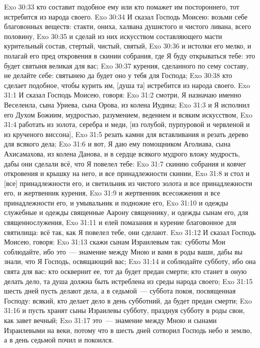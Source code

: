 \vs Exo 30:33 кто составит подобное ему или кто помажет им постороннего, тот истребится из народа своего.
\rsbpar\vs Exo 30:34 И сказал Господь Моисею: возьми себе благовонных веществ: стакти, ониха, халвана душистого и чистого ливана, всего половину,
\vs Exo 30:35 и сделай из них искусством составляющего масти курительный состав, стертый, чистый, святый,
\vs Exo 30:36 и истолки его мелко, и полагай его пред  откровения в скинии собрания, где Я буду открываться тебе: это будет святыня великая для вас;
\vs Exo 30:37 курения, сделанного по сему составу, не делайте себе: святынею да будет оно у тебя для Господа;
\vs Exo 30:38 кто сделает подобное, чтобы курить им, [душа та] истребится из народа своего.
\vs Exo 31:1 И сказал Господь Моисею, говоря:
\vs Exo 31:2 смотри, Я назначаю именно Веселеила, сына Уриева, сына Орова, из колена Иудина;
\vs Exo 31:3 и Я исполнил его Духом Божиим, мудростью, разумением, ведением и всяким искусством,
\vs Exo 31:4 работать из золота, серебра и меди, [из голубой, пурпуровой и червленой  и из крученого виссона],
\vs Exo 31:5 резать камни для вставливания и резать дерево для всякого дела;
\vs Exo 31:6 и вот, Я даю ему помощником Аголиава, сына Ахисамахова, из колена Данова, и в сердце всякого мудрого вложу мудрость, дабы они сделали всё, что Я повелел тебе:
\vs Exo 31:7 скинию собрания и ковчег откровения и крышку на него, и все принадлежности скинии,
\vs Exo 31:8 и стол и [все] принадлежности его, и светильник из чистого золота и все принадлежности его, и жертвенник курения,
\vs Exo 31:9 и жертвенник всесожжения и все принадлежности его, и умывальник и подножие его,
\vs Exo 31:10 и одежды служебные и одежды священные Аарону священнику, и одежды сынам его, для священнослужения,
\vs Exo 31:11 и елей помазания и курение благовонное для святилища: всё так, как Я повелел тебе, они сделают.
\rsbpar\vs Exo 31:12 И сказал Господь Моисею, говоря:
\vs Exo 31:13 скажи сынам Израилевым так: субботы Мои соблюдайте, ибо это~--- знамение между Мною и вами в роды ваши, дабы вы знали, что Я Господь, освящающий вас;
\vs Exo 31:14 и соблюдайте субботу, ибо она свята для вас: кто осквернит ее, тот да будет предан смерти; кто станет в оную делать дело, та душа должна быть истреблена из среды народа своего;
\vs Exo 31:15 шесть дней пусть делают дела, а в седьмой~--- суббота покоя, посвященная Господу: всякий, кто делает дело в день субботний, да будет предан смерти;
\vs Exo 31:16 и пусть хранят сыны Израилевы субботу, празднуя субботу в роды свои, как завет вечный;
\vs Exo 31:17 это~--- знамение между Мною и сынами Израилевыми на веки, потому что в шесть дней сотворил Господь небо и землю, а в день седьмой почил и покоился.
